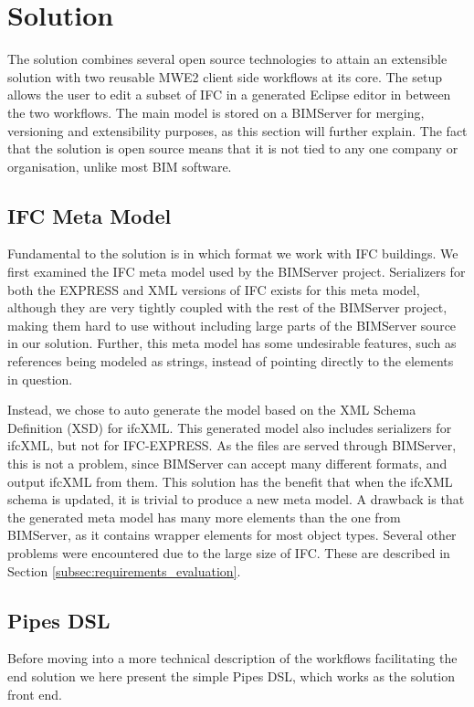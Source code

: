 \section{Solution}
The solution combines several open source technologies to attain an extensible solution with two reusable MWE2 client side workflows at its core. The setup allows the user to edit a subset of IFC in a generated Eclipse editor in between the two workflows. The main model is stored on a BIMServer for merging, versioning and extensibility purposes, as this section will further explain. The fact that the solution is open source means that it is not tied to any one company or organisation, unlike most BIM software.

\subsection{IFC Meta Model}
\label{subsec:ifc_meta_model}
Fundamental to the solution is in which format we work with IFC buildings. We first examined the IFC meta model used by the BIMServer project. Serializers for both the EXPRESS and XML versions of IFC exists for this meta model, although they are very tightly coupled with the rest of the BIMServer project, making them hard to use without including large parts of the BIMServer source in our solution. Further, this meta model has some undesirable features, such as references being modeled as strings, instead of pointing directly to the elements in question.

Instead, we chose to auto generate the model based on the XML Schema Definition (XSD) for ifcXML. This generated model also includes serializers for ifcXML, but not for IFC-EXPRESS. As the files are served through BIMServer, this is not a problem, since BIMServer can accept many different formats, and output ifcXML from them. This solution has the benefit that when the ifcXML schema is updated, it is trivial to produce a new meta model. A drawback is that the generated meta model has many more elements than the one from BIMServer, as it contains wrapper elements for most object types. Several other problems were encountered due to the large size of IFC. These are described in Section \ref{subsec:requirements_evaluation}.

\subsection{Pipes DSL}
\label{subsec:pipes_dsl}
Before moving into a more technical description of the workflows facilitating the end solution we here present the simple Pipes DSL, which works as the solution front end.

